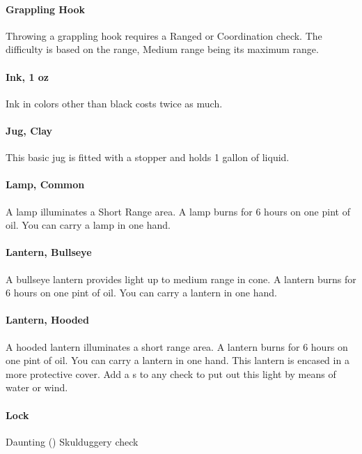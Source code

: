 \begin{multicols}{2}
\paragraph{Grappling Hook} \label{advitm:grapplinghook}
Throwing a grappling hook requires a
Ranged or Coordination check. The difficulty is based on
the range, Medium range being its maximum range.

\paragraph{Ink, 1 oz} \label{advitm:ink}
Ink in colors other than black costs twice as much.

\paragraph{Jug, Clay} \label{advitm:jug}
This basic jug is fitted with a stopper and holds 1 gallon of liquid.

\paragraph{Lamp, Common} \label{advitm:lamp_common}
A lamp illuminates a Short Range area. A lamp burns
for 6 hours on one pint of oil. You can carry a lamp in
one hand.

\paragraph{Lantern, Bullseye} \label{advitm:lantern_bullseye}
A bullseye lantern provides light up to medium range in
cone. A lantern burns for 6 hours on one pint of oil. You
can carry a lantern in one hand.

\paragraph{Lantern, Hooded} \label{advitm:lantern_hooded}
A hooded lantern illuminates a short range area. A
lantern burns for 6 hours on one pint of oil. You can
carry a lantern in one hand.
This lantern is encased in a more protective cover.
Add a s to any check to put out this light by means of
water or wind.

\paragraph{Lock} \label{advitm:lock}
Daunting (\difficulty\difficulty\difficulty\difficulty) Skulduggery check


\end{multicols}
